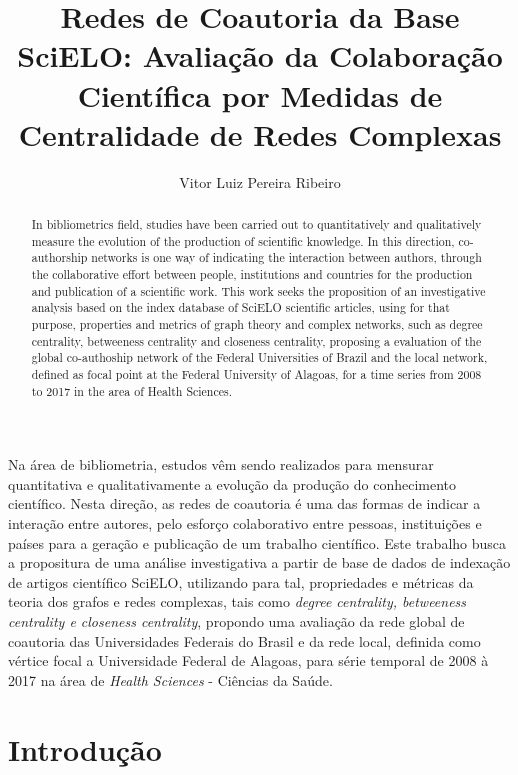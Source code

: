 \documentclass[12pt]{article}
\title{Redes de Coautoria da Base SciELO: Avaliação da Colaboração Científica por Medidas de Centralidade de Redes Complexas}
\author{Vitor Luiz Pereira Ribeiro}
\begin{document}
 

\maketitle

\begin{abstract}
In bibliometrics field, studies have been carried out to quantitatively and qualitatively measure the evolution of the production of scientific knowledge. In this direction, co-authorship networks is one way of indicating the interaction between authors, through the collaborative effort between people, institutions and countries for the production and publication of a scientific work. This work seeks the proposition of an investigative analysis based on the index database of SciELO scientific articles, using for that purpose, properties and metrics of graph theory and complex networks, such as degree centrality, betweeness centrality and closeness centrality, proposing a evaluation of the global co-authoship network of the Federal Universities of Brazil and the local network, defined as focal point at the Federal University of Alagoas, for a time series from 2008 to 2017 in the area of Health Sciences. 
\end{abstract}
     
\begin{resumo} 
Na área de bibliometria, estudos vêm sendo realizados para mensurar quantitativa e qualitativamente a evolução da produção do conhecimento científico. Nesta direção, as redes de coautoria é uma das formas de indicar a interação entre autores, pelo esforço colaborativo entre pessoas, instituições e países para a geração e publicação de um trabalho científico. Este trabalho busca a propositura de uma análise investigativa a partir de base de dados de indexação de artigos científico SciELO, utilizando para tal, propriedades e métricas da teoria dos grafos e redes complexas, tais como \textit{degree centrality, betweeness centrality e closeness centrality}, propondo uma avaliação da rede global de coautoria das Universidades Federais do Brasil e da rede local, definida como vértice focal a Universidade Federal de Alagoas, para série temporal de 2008 à 2017 na área de \textit{Health Sciences} - Ciências da Saúde.
\end{resumo}


\section{Introdução}
\end{document}
